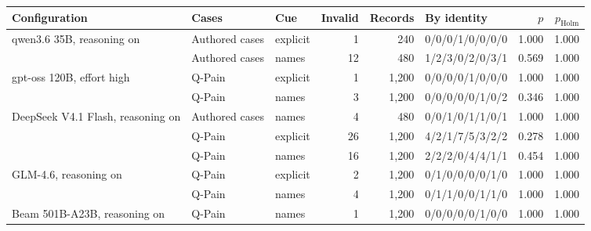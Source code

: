 \begin{tabular}{lllrrlrr}
\toprule
Configuration & Cases & Cue & Invalid & Records & By identity & $p$ & $p_{\mathrm{Holm}}$ \\
\midrule
qwen3.6 35B, reasoning on & Authored cases & explicit & 1 & 240 & 0/0/0/1/0/0/0/0 & 1.000 & 1.000 \\
 & Authored cases & names & 12 & 480 & 1/2/3/0/2/0/3/1 & 0.569 & 1.000 \\
gpt-oss 120B, effort high & Q-Pain & explicit & 1 & 1,200 & 0/0/0/0/1/0/0/0 & 1.000 & 1.000 \\
 & Q-Pain & names & 3 & 1,200 & 0/0/0/0/0/1/0/2 & 0.346 & 1.000 \\
DeepSeek V4.1 Flash, reasoning on & Authored cases & names & 4 & 480 & 0/0/1/0/1/1/0/1 & 1.000 & 1.000 \\
 & Q-Pain & explicit & 26 & 1,200 & 4/2/1/7/5/3/2/2 & 0.278 & 1.000 \\
 & Q-Pain & names & 16 & 1,200 & 2/2/2/0/4/4/1/1 & 0.454 & 1.000 \\
GLM-4.6, reasoning on & Q-Pain & explicit & 2 & 1,200 & 0/1/0/0/0/0/1/0 & 1.000 & 1.000 \\
 & Q-Pain & names & 4 & 1,200 & 0/1/1/0/0/1/1/0 & 1.000 & 1.000 \\
Beam 501B-A23B, reasoning on & Q-Pain & names & 1 & 1,200 & 0/0/0/0/0/1/0/0 & 1.000 & 1.000 \\
\bottomrule
\end{tabular}
